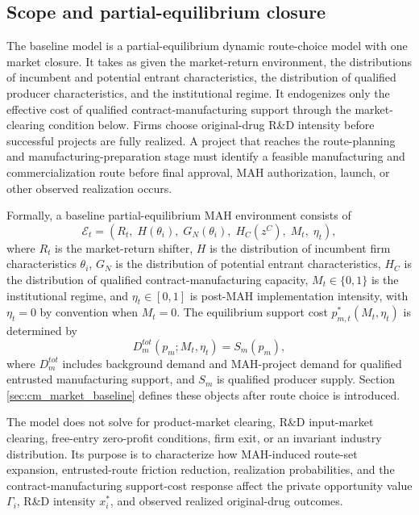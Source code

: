 \documentclass[12pt]{article}
\newcommand{\1}{\mathbf{1}}
\begin{document}
\subsection{Scope and partial-equilibrium closure}

The baseline model is a partial-equilibrium dynamic route-choice model with one market closure. It takes as given the market-return environment, the distributions of incumbent and potential entrant characteristics, the distribution of qualified producer characteristics, and the institutional regime. It endogenizes only the effective cost of qualified contract-manufacturing support through the market-clearing condition below. Firms choose original-drug R\&D intensity before successful projects are fully realized. A project that reaches the route-planning and manufacturing-preparation stage must identify a feasible manufacturing and commercialization route before final approval, MAH authorization, launch, or other observed realization occurs.

Formally, a baseline partial-equilibrium MAH environment consists of
\begin{equation}
    \mathcal E_t =
    \left(
    R_t,\; H(\theta_i),\; G_N(\theta_i),\; H_C(z^C),\; M_t,\; \eta_t
    \right),
    \label{eq:pe_environment}
\end{equation}
where $R_t$ is the market-return shifter, $H$ is the distribution of incumbent firm characteristics $\theta_i$, $G_N$ is the distribution of potential entrant characteristics, $H_C$ is the distribution of qualified contract-manufacturing capacity, $M_t\in\{0,1\}$ is the institutional regime, and $\eta_t\in[0,1]$ is post-MAH implementation intensity, with $\eta_t=0$ by convention when $M_t=0$. The equilibrium support cost $p_{m,t}^*(M_t,\eta_t)$ is determined by
\begin{equation}
    D_m^{tot}(p_m;M_t,\eta_t)=S_m(p_m),
    \label{eq:baseline_cm_clearing}
\end{equation}
where $D_m^{tot}$ includes background demand and MAH-project demand for qualified entrusted manufacturing support, and $S_m$ is qualified producer supply. Section \ref{sec:cm_market_baseline} defines these objects after route choice is introduced.

The model does not solve for product-market clearing, R\&D input-market clearing, free-entry zero-profit conditions, firm exit, or an invariant industry distribution. Its purpose is to characterize how MAH-induced route-set expansion, entrusted-route friction reduction, realization probabilities, and the contract-manufacturing support-cost response affect the private opportunity value $\Gamma_i$, R\&D intensity $x_i^*$, and observed realized original-drug outcomes.
\end{document}
